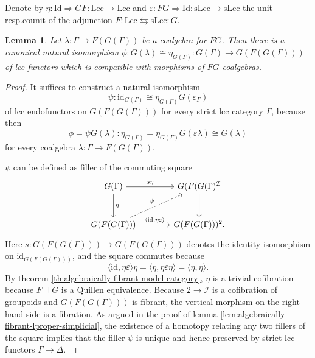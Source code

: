\documentclass[a4paper]{article}
\newtheorem{lemma}[theorem]{Lemma}
\theoremstyle{remark}
\theoremstyle{definition}
\begin{document}
Denote by $\eta : \mathrm{Id} \Rightarrow G F : \mathrm{Lcc} \rightarrow \mathrm{Lcc}$ and $\varepsilon : F G \Rightarrow \mathrm{Id} : \mathrm{sLcc} \rightarrow \mathrm{sLcc}$ the unit resp.\@ counit of the adjunction $F : \mathrm{Lcc} \leftrightarrows \mathrm{sLcc} : G$.
\begin{lemma}
  \label{lem:coalgebra-vs-eta}
  Let $\lambda : \Gamma \rightarrow F(G(\Gamma))$ be a coalgebra for $FG$.
  Then there is a canonical natural isomorphism $\phi : G(\lambda) \cong \eta_{G(\Gamma)} : G(\Gamma) \rightarrow G(F(G(\Gamma)))$ of lcc functors which is compatible with morphisms of $FG$-coalgebras.
\end{lemma}
\begin{proof}
  It suffices to construct a natural isomorphism
  \begin{equation}
    \psi : \mathrm{id}_{G(\Gamma)} \cong \eta_{G(\Gamma)} G(\varepsilon_\Gamma)
  \end{equation}
  of lcc endofunctors on $G(F(G(\Gamma)))$ for every strict lcc category $\Gamma$, because then
  \begin{equation}
    \phi = \psi G(\lambda) : \eta_{G(\Gamma)} = \eta_{G(\Gamma)} G(\varepsilon \lambda) \cong G(\lambda)
  \end{equation}
  for every coalgebra $\lambda : \Gamma \rightarrow F(G(\Gamma))$.

  $\psi$ can be defined as filler of the commuting square
  \begin{equation}
    \begin{tikzcd}[column sep=large, row sep=large]
      G(\Gamma) \arrow[d, "\eta"] \arrow[r, "s \eta"] & G(F(G(\Gamma)^\mathcal{I} \arrow[d] \\
      G(F(G(\Gamma))) \arrow[r, "{\langle \mathrm{id}, \eta \varepsilon \rangle}"] \arrow[ur, dashed, "\psi"] & G(F(G(\Gamma)))^2.
    \end{tikzcd}
  \end{equation}
  Here $s : G(F(G(\Gamma))) \rightarrow G(F(G(\Gamma)))$ denotes the identity isomorphism on $\mathrm{id}_{G(F(G(\Gamma)))}$, and the square commutes because
  \begin{equation}
    \langle \mathrm{id}, \eta \varepsilon \rangle \eta = \langle \eta, \eta \varepsilon \eta \rangle = \langle \eta, \eta \rangle.
  \end{equation}
  By theorem \ref{th:algebraically-fibrant-model-category}, $\eta$ is a trivial cofibration because $F \dashv G$ is a Quillen equivalence.
  Because $2 \rightarrow \mathcal{I}$ is a cofibration of groupoids and $G(F(G(\Gamma)))$ is fibrant, the vertical morphism on the right-hand side is a fibration.
  As argued in the proof of lemma \ref{lem:algebraically-fibrant-lproper-simplicial}, the existence of a homotopy relating any two fillers of the square implies that the filler $\psi$ is unique and hence preserved by strict lcc functors $\Gamma \rightarrow \Delta$.
\end{proof}
\end{document}
